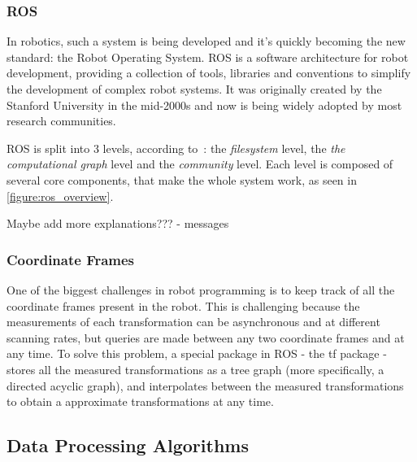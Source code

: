 \subsubsection{ROS}

In robotics, such a system is being developed and it's quickly becoming the new standard: the Robot Operating System. ROS is a software architecture for robot development, providing a collection of tools, libraries and conventions to simplify the development of complex robot systems. It was originally created by the Stanford University in the mid-2000s and now is being widely adopted by most research communities.

ROS is split into 3 levels, according to~\cite{fernandez_2015}: the \textit{filesystem} level, the \textit{the computational graph} level and the \textit{community} level. Each level is composed of several core components, that make the whole system work, as seen in \cref{figure:ros_overview}.



{\huge Maybe add more explanations???
    - messages
}

\subsubsection{Coordinate Frames}

One of the biggest challenges in robot programming is to keep track of all the coordinate frames present in the robot. This is challenging because the measurements of each transformation can be asynchronous and at different scanning rates, but queries are made between any two coordinate frames and at any time. To solve this problem, a special package in ROS - the tf package - stores all the measured transformations as a tree graph (more specifically, a directed acyclic graph), and interpolates between the measured transformations to obtain a approximate transformations at any time. 



\subsection{Data Processing Algorithms}
\label{section:software_data_processing}